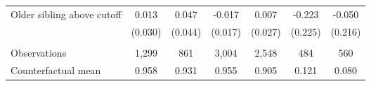 {{\begin{tabular}{lcccccc}
Older sibling above cutoff&       0.013   &       0.047   &      -0.017   &       0.007   &      -0.223   &      -0.050   \\
                    &     (0.030)   &     (0.044)   &     (0.017)   &     (0.027)   &     (0.225)   &     (0.216)   \\
                    &               &               &               &               &               &               \\
Observations        &       1,299   &         861   &       3,004   &       2,548   &         484   &         560   \\
Counterfactual mean &       0.958   &       0.931   &       0.955   &       0.905   &       0.121   &       0.080   \\
 

\bottomrule
\end{tabular}
}
}
